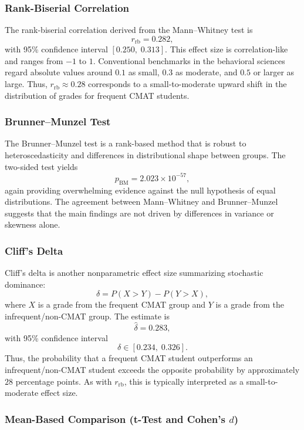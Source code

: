 \documentclass[8pt,a4paper]{article} %
\numberwithin{figure}{subsection}
\begin{document}
\subsubsection{Rank-Biserial Correlation}

The rank-biserial correlation derived from the Mann--Whitney test
is
\[
r_{\text{rb}} = 0.282,
\]
with 95\% confidence interval $[0.250,\; 0.313]$. This effect size
is correlation-like and ranges from $-1$ to $1$. Conventional
benchmarks in the behavioral sciences regard absolute values around
$0.1$ as small, $0.3$ as moderate, and $0.5$ or larger as large.
Thus, $r_{\text{rb}} \approx 0.28$ corresponds to a small-to-moderate
upward shift in the distribution of grades for frequent CMAT
students.

\subsubsection{Brunner--Munzel Test}

The Brunner--Munzel test is a rank-based method that is robust to
heteroscedasticity and differences in distributional shape between
groups. The two-sided test yields
\[
p_{\text{BM}} = 2.023 \times 10^{-57},
\]
again providing overwhelming evidence against the null hypothesis
of equal distributions. The agreement between Mann--Whitney and
Brunner--Munzel suggests that the main findings are not driven by
differences in variance or skewness alone.

\subsubsection{Cliff's Delta}

Cliff's delta is another nonparametric effect size summarizing
stochastic dominance:
\[
\delta = P(X>Y) - P(Y>X),
\]
where $X$ is a grade from the frequent CMAT group and $Y$ is a
grade from the infrequent/non-CMAT group. The estimate is
\[
\hat{\delta} = 0.283,
\]
with 95\% confidence interval
\[
\delta \in [0.234,\; 0.326].
\]
Thus, the probability that a frequent CMAT student outperforms an
infrequent/non-CMAT student exceeds the opposite probability by
approximately $28$ percentage points. As with $r_{\text{rb}}$, this
is typically interpreted as a small-to-moderate effect size.

\subsubsection{Mean-Based Comparison (t-Test and Cohen's \texorpdfstring{$d$}{d})}
\end{document}
